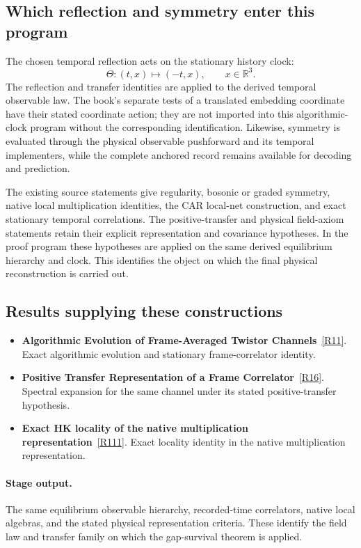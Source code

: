 \documentclass[11pt,a4paper]{article}
\begin{document}
\subsection*{Which reflection and symmetry enter this program}
The chosen temporal reflection acts on the stationary history clock:
\[
\Theta:(t,x)\mapsto(-t,x),\qquad x\in\mathbb R^3.
\]
The reflection and transfer identities are applied to the derived temporal observable law. The book's separate tests of a translated embedding coordinate have their stated coordinate action; they are not imported into this algorithmic-clock program without the corresponding identification. Likewise, symmetry is evaluated through the physical observable pushforward and its temporal implementers, while the complete anchored record remains available for decoding and prediction.

The existing source statements give regularity, bosonic or graded symmetry, native local multiplication identities, the CAR local-net construction, and exact stationary temporal correlations. The positive-transfer and physical field-axiom statements retain their explicit representation and covariance hypotheses. In the proof program these hypotheses are applied on the same derived equilibrium hierarchy and clock. This identifies the object on which the final physical reconstruction is carried out.
\subsection*{Results supplying these constructions}
\begin{itemize}
\item \textbf{Algorithmic Evolution of Frame-Averaged Twistor Channels}~\hyperref[src:thm-effective-twistor-spectral-meaning]{[R11]}. Exact algorithmic evolution and stationary frame-correlator identity.
\item \textbf{Positive Transfer Representation of a Frame Correlator}~\hyperref[src:cor-effective-twistor-positive-transfer]{[R16]}. Spectral expansion for the same channel under its stated positive-transfer hypothesis.
\item \textbf{Exact HK locality of the native multiplication representation}~\hyperref[src:thm-ym-native-multiplication-locality]{[R111]}. Exact locality identity in the native multiplication representation.
\end{itemize}
\paragraph{Stage output.} The same equilibrium observable hierarchy, recorded-time correlators, native local algebras, and the stated physical representation criteria. These identify the field law and transfer family on which the gap-survival theorem is applied.
\end{document}
